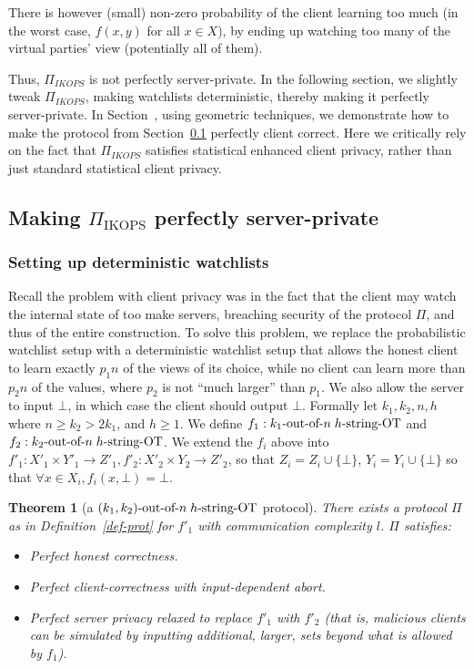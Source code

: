 \documentclass[a4paper]{article}
\newtheorem{theorem}{Theorem}[section]
\newcommand{\sOT}[3]{#1\text{-out-of-}#2\text{\;$#3$-string-OT}}
\begin{document}
There is however (small) non-zero probability of the client learning too much (in the worst case, $f(x,y)$ for all $x\in X$), by ending up watching too many of the virtual parties' view (potentially all of them). 

Thus, $\Pi_{IKOPS}$ is not perfectly server-private.
In the following section, we slightly tweak $\Pi_{IKOPS}$, making watchlists deterministic, thereby making it perfectly server-private. In Section~\cite{sec-serv-perf}, using geometric techniques, we demonstrate how to make the protocol from Section~\ref{sec-client-pr} perfectly client correct. Here we critically rely on the fact that $\Pi_{IKOPS}$ satisfies statistical enhanced client privacy, rather than just standard statistical client privacy. 

\subsection{Making $\Pi_{\text{IKOPS}}$ perfectly server-private}\label{sec-client-pr}

\subsubsection{Setting up deterministic watchlists}
Recall the problem with client privacy was in the fact that the client may watch the internal state of too make servers, breaching security of the protocol $\Pi$, and thus of the entire construction.
To solve this problem, we replace the probabilistic watchlist setup with a deterministic watchlist setup that allows the honest client to learn exactly $p_1n$ of the views of its choice, while no client can learn more than $p_2n$ of the values, where $p_2$ is not ``much larger'' than $p_1$. We also allow the server to input $\bot$, in which case the client should output $\bot$. Formally let $k_1,k_2,n,h$ where $n\geq k_2 > 2k_1$, and $h\geq 1$. We define $f_1:\sOT{k_1}{n}{h}$ and $f_2:\sOT{k_2}{n}{h}$. We extend the $f_i$ above into $f'_1:X'_1\times Y'_1\rightarrow Z'_1,f'_2:X'_2\times Y_2\rightarrow Z'_2$, so that $Z_i=Z_i\cup{\{\bot\}}$, $Y_i=Y_i\cup{\{\bot\}}$  so that $\forall x\in X_i,f_i(x,\bot)=\bot$.

\begin{theorem}[a $\sOT{(k_1,k_2)}{n}{h}$ protocol]
	There exists a protocol $\Pi$ as in Definition~\ref{def-prot} for $f'_1$ with communication complexity $l$. $\Pi$ satisfies:
	\begin{itemize}
	\item Perfect honest correctness.	
	\item Perfect client-correctness with input-dependent abort.
	\item Perfect server privacy relaxed to replace $f'_1$ with $f'_2$ (that is, malicious clients can be simulated by inputting additional, larger, sets beyond what is allowed by $f_1$).
	 \end{itemize} 
\end{theorem}
\end{document}
